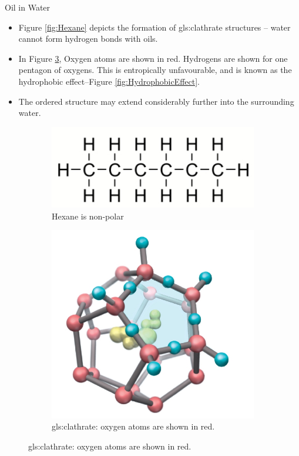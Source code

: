 \documentclass[]{article}
\begin{document}
Oil in Water
\begin{itemize}
	\item Figure \ref{fig:Hexane} depicts the formation of \gls{gls:clathrate} structures – water cannot form hydrogen bonds with oils.
	\item In Figure \ref {fig:clathrate}, Oxygen atoms are shown in red. Hydrogens are shown for one pentagon of oxygens. This is entropically unfavourable, and is known as the hydrophobic effect--Figure \ref{fig:HydrophobicEffect}.
	\item The ordered structure may extend considerably
	further into the surrounding water.
\end{itemize}
\begin{figure}[H]
	\centering
	\caption{Oil in water} \label{fig:Hexane} 
	\begin{subfigure}{.4\textwidth}
		\centering
		\includegraphics[width=.4\linewidth]{Hexane}
		\caption{Hexane is non-polar}
		\label{fig:hexane}
	\end{subfigure}%
	\begin{subfigure}{.6\textwidth}
		\centering
		\includegraphics[width=.4\linewidth]{OilInWater.jpg}
		\caption{\Gls{gls:clathrate}: oxygen atoms are shown in red.}
		\label{fig:clathrate}
	\end{subfigure}
\end{figure}
\end{document}
